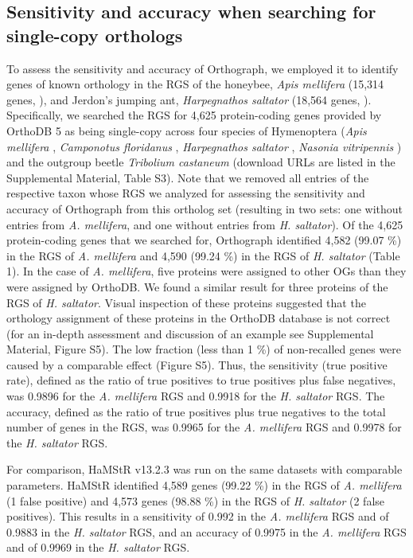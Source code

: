\subsection{Sensitivity and accuracy when searching for single-copy
orthologs}\label{sensitivity-and-accuracy-when-searching-for-single-copy-orthologs}

To assess the sensitivity and accuracy of Orthograph, we employed it to
identify genes of known orthology in the RGS of the honeybee, \emph{Apis
mellifera} (15,314 genes, \cite{Honeybee2006}), and Jerdon's jumping
ant, \emph{Harpegnathos saltator} (18,564 genes, \cite{Bonasio2010}).
Specifically, we searched the RGS for 4,625 protein-coding genes
provided by OrthoDB 5 \cite{Waterhouse2011} as being single-copy across
four species of Hymenoptera (\emph{Apis mellifera} \cite{Honeybee2006},
\emph{Camponotus floridanus} \cite{Bonasio2010}, \emph{Harpegnathos
saltator} \cite{Bonasio2010}, \emph{Nasonia vitripennis}
\cite{Werren2010}) and the outgroup beetle \emph{Tribolium castaneum}
\cite{Richards2008} (download URLs are listed in the Supplemental
Material, Table S3). Note that we removed all entries of the respective
taxon whose RGS we analyzed for assessing the sensitivity and accuracy
of Orthograph from this ortholog set (resulting in two sets: one without
entries from \emph{A. mellifera}, and one without entries from \emph{H.
saltator}). Of the 4,625 protein-coding genes that we searched for,
Orthograph identified 4,582 (99.07 \%) in the RGS of \emph{A. mellifera}
and 4,590 (99.24 \%) in the RGS of \emph{H. saltator} (Table 1). In the
case of \emph{A. mellifera}, five proteins were assigned to other OGs
than they were assigned by OrthoDB. We found a similar result for three
proteins of the RGS of \emph{H. saltator}. Visual inspection of these
proteins suggested that the orthology assignment of these proteins in
the OrthoDB database is not correct (for an in-depth assessment and
discussion of an example see Supplemental Material, Figure S5). The low
fraction (less than 1 \%) of non-recalled genes were caused by a
comparable effect (Figure S5). Thus, the sensitivity (true positive
rate), defined as the ratio of true positives to true positives plus
false negatives, was 0.9896 for the \emph{A. mellifera} RGS and 0.9918
for the \emph{H. saltator} RGS. The accuracy, defined as the ratio of
true positives plus true negatives to the total number of genes in the
RGS, was 0.9965 for the \emph{A. mellifera} RGS and 0.9978 for the
\emph{H. saltator} RGS.

For comparison, HaMStR v13.2.3 was run on the same datasets with
comparable parameters. HaMStR identified 4,589 genes (99.22 \%) in the
RGS of \emph{A. mellifera} (1 false positive) and 4,573 genes (98.88 \%)
in the RGS of \emph{H. saltator} (2 false positives). This results in a
sensitivity of 0.992 in the \emph{A. mellifera} RGS and of 0.9883 in the
\emph{H. saltator} RGS, and an accuracy of 0.9975 in the \emph{A.
mellifera} RGS and of 0.9969 in the \emph{H. saltator} RGS.

